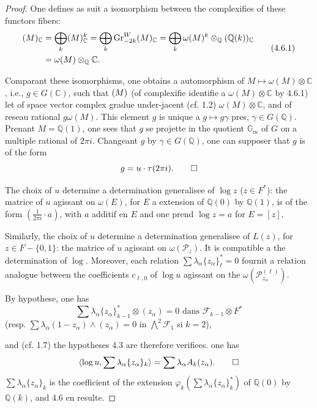 \documentclass[12pt,a4paper]{article}
\theoremstyle{plain}
\theoremstyle{definition}
\theoremstyle{remark}
\newcommand{\Q}{\mathbb{Q}}
\newcommand{\C}{\mathbb{C}}
\newcommand{\Gm}{\mathbb{G}_m}
\newcommand{\F}{\mathcal{F}}
\begin{document}
{{\begin{proof}
One defines as suit a isomorphism between the complexifies of these functors fibers:
\begin{equation}\label{eq:4.6.1}
\begin{aligned}
\real(M)_\C &= \bigoplus_k\real(M)_\C^k = \bigoplus_k\operatorname{Gr}^W_{-2k}\real(M)_\C = \bigoplus_k\omega(M)^k\otimes_\Q\real(\Q(k))_\C\\
&= \omega(M)\otimes_\Q\C.
\end{aligned}
\tag{4.6.1}
\end{equation}

Comparant these isomorphisms, one obtains a automorphism of $M\mapsto\omega(M)\otimes\C$, i.e., $g\in G(\C)$, such that $\real(M)$ (of complexifie identifie {a} $\omega(M)\otimes\C$ by 4.6.1) let of space vector complex gradue under-jacent (cf. 1.2) $\omega(M)\otimes\C$, and of reseau rational $g\omega(M)$. This element $g$ is unique {a} $g\mapsto g\gamma$ pres, $\gamma\in G(\Q)$. Prenant $M=\Q(1)$, one sees that $g$ se projette in the quotient $\Gm$ of $G$ on a multiple rational of $2\pi i$. Changeant $g$ by $\gamma\in G(\Q)$, one can supposer that $g$ is of the form
\begin{equation*}
g = u\cdot\tau(2\pi i).\qedhere
\end{equation*}

The choix of $u$ determine a determination generalisee of $\log z$ ($z\in F^*$): the matrice of $u$ agissant on $\omega(E)$, for $E$ a extension of $\Q(0)$ by $\Q(1)$, is of the form $(\frac{1}{2\pi i}\cdot a)$, with $a$ additif en $E$ and one prend $\log z=a$ for $E=[z]$.

Similarly, the choix of $u$ determine a determination generalisee of $L(z)$, for $z\in F-\{0,1\}$: the matrice of $u$ agissant on $\omega(\mathcal{P}_z)$. It is compatible {a} the determination of $\log$. Moreover, each relation $\sum\lambda_\alpha\{z_\alpha\}_\ell^*=0$ fournit a relation analogue between the coefficients $c_{\ell,0}$ of $\log u$ agissant on the $\omega(\mathcal{P}_{z_\alpha}^{(\ell)})$.

By hypothese, one has
\begin{equation*}
\sum\lambda_\alpha\{z_\alpha\}_{k-1}^*\otimes(z_\alpha)=0\text{ dans }\F_{k-1}\otimes F^*
\end{equation*}
(resp. $\sum\lambda_\alpha(1-z_\alpha)\wedge(z_\alpha)=0$ in $\bigwedge^2\F_1$ si $k=2$),

and (cf. 1.7) the hypotheses 4.3 are therefore verifiees. one has
\begin{equation*}
\langle\log u,\sum\lambda_\alpha\{z_\alpha\}_k\rangle = \sum\lambda_\alpha A_k(z_\alpha).\qedhere
\end{equation*}
$\sum\lambda_\alpha\{z_\alpha\}_k$ is the coefficient of the extension $\varphi_k(\sum\lambda_\alpha\{z_\alpha\}_k^*)$ of $\Q(0)$ by $\Q(k)$, and 4.6 en resulte.
\end{proof}

}}
\end{document}
